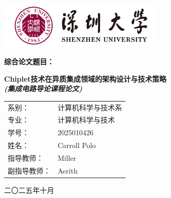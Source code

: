 
\begin{titlepage}
	\centering

	\includegraphics[width=0.6\textwidth]{img/SZU_logo.png} \\
	\vspace{0.5cm} %
	
	\LARGE\bfseries
	综合论文题目： \\
	\vspace{0.5cm} %
	
	\large\bfseries
	Chiplet技术在异质集成领域的架构设计与技术策略 \\
	\textit{(集成电路导论课程论文)} \\
	
	\vspace{2cm} %
	
	\begin{tabular}{l l}
		系别： & 计算机科学与技术系 \\
		专业： & 计算机科学与技术 \\
		学号： & 2025010426 \\
		姓名： & Carroll Polo \\
		指导教师： & Miller  \\
		副指导教师： & Aerith  \\
	\end{tabular}
	
	\vfill %
	
	\large
	二〇二五年十月 \\
\end{titlepage}



	
